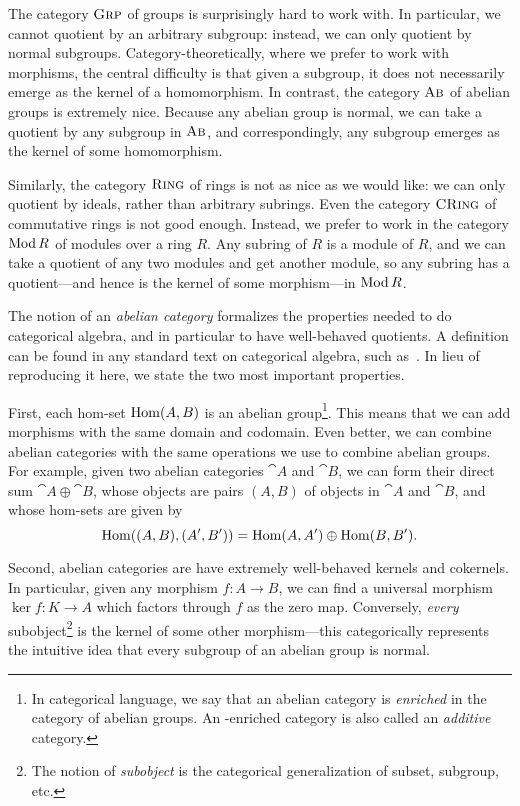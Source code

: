 \documentclass[11pt]{article}
\begin{document}
The category ${\textsc{\text{Grp}}}$ of groups is surprisingly hard to work with. In
particular, we cannot quotient by an arbitrary subgroup: instead, we can only
quotient by normal subgroups. Category-theoretically, where we prefer to work
with morphisms, the central difficulty is that given a subgroup, it does not
necessarily emerge as the kernel of a homomorphism. In contrast, the category
${\textsc{\text{Ab}}}$ of abelian groups is extremely nice. Because any abelian group is
normal, we can take a quotient by any subgroup in ${\textsc{\text{Ab}}}$, and
correspondingly, any subgroup emerges as the kernel of some homomorphism.

Similarly, the category ${\textsc{\text{Ring}}}$ of rings is not as nice as we would like:
we can only quotient by ideals, rather than arbitrary subrings. Even the
category ${\textsc{\text{CRing}}}$ of commutative rings is not good enough. Instead, we
prefer to work in the category $\operatorname{Mod} R$ of modules over a ring $R$. Any subring
of $R$ is a module of $R$, and we can take a quotient of any two modules and get
another module, so any subring has a quotient---and hence is the kernel of some
morphism---in $\operatorname{Mod} R$.

The notion of an \emph{abelian category} formalizes the properties needed to do
categorical algebra, and in particular to have well-behaved quotients. A
definition can be found in any standard text on categorical algebra, such
as~\cite{borceux}. In lieu of reproducing it here, we state the two most
important properties.

First, each hom-set $\operatorname{Hom}(A, B)$ is an abelian group\footnote{
	In categorical language, we say that an abelian category is \emph{enriched} in
	the category  of abelian groups. An -enriched category is
	also called an \emph{additive} category.
}. This means that we can add morphisms with the same domain and codomain. Even
better, we can combine abelian categories with the same operations we use to
combine abelian groups. For example, given two abelian categories $\cat{A}$ and
$\cat{B}$, we can form their direct sum $\cat{A}\oplus\cat{B}$, whose objects
are pairs $(A,B)$ of objects in $\cat{A}$ and $\cat{B}$, and whose hom-sets are
given by \[ \operatorname{Hom}((A,B), (A',B')) = \operatorname{Hom}(A,A')\oplus\operatorname{Hom}(B,B'). \]

Second, abelian categories are have extremely well-behaved kernels and
cokernels. In particular, given any morphism $f: A\rightarrow B$, we can find a
universal morphism $\ker f: K\rightarrow A$ which factors through $f$ as the
zero map. Conversely, \emph{every} subobject\footnote{The notion of
	\emph{subobject} is the categorical generalization of subset, subgroup, etc.} is
the kernel of some other morphism---this categorically represents the intuitive
idea that every subgroup of an abelian group is normal.
\end{document}
